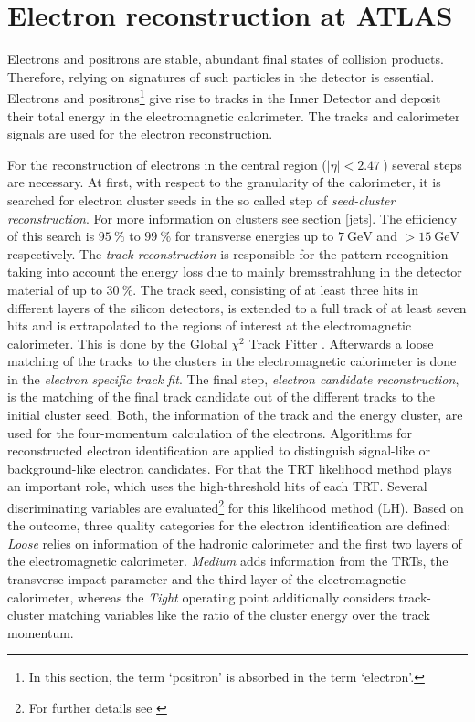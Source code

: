 \section{Electron reconstruction at ATLAS}\label{eReconstruction}
Electrons and positrons are stable, abundant final states of collision products. Therefore, relying on signatures of such particles in the detector is essential. Electrons and positrons\footnote{In this section, the term `positron' is absorbed in the term `electron'.} give rise to tracks in the Inner Detector and deposit their total energy in the electromagnetic calorimeter. The tracks and calorimeter signals are used for the electron reconstruction. \cite{ePerformance}\par
For the reconstruction of electrons in the central region ($|\eta|<\SI{2.47}{}$) several steps are necessary. At first, with respect to the granularity of the calorimeter, it is searched for electron cluster seeds in the so called step of \textit{seed-cluster reconstruction}. For more information on clusters see section \ref{jets}. The efficiency of this search is $\SI{95}{\percent}$ to $\SI{99}{\percent}$ for transverse energies up to $\SI{7}{\giga\electronvolt}$ and $>\SI{15}{\giga\electronvolt}$ respectively. The \textit{track reconstruction} is responsible for the pattern recognition taking into account the energy loss due to mainly bremsstrahlung in the detector material of up to $\SI{30}{\percent}$. The track seed, consisting of at least three hits in different layers of the silicon detectors, is extended to a full track of at least seven hits and is extrapolated to the regions of interest at the electromagnetic calorimeter. This is done by the {\ATLAS} Global $\chi^2$ Track Fitter \cite{trackfitter}. Afterwards a loose matching of the tracks to the clusters in the electromagnetic calorimeter is done in the \textit{electron specific track fit}. The final step, \textit{electron candidate reconstruction}, is the matching of the final track candidate out of the different tracks to the initial cluster seed. \cite{ePerformance}\newline
Both, the information of the track and the energy cluster, are used for the four-momentum calculation of the electrons. Algorithms for reconstructed electron identification are applied to distinguish signal-like or background-like electron candidates. For that the TRT likelihood method plays an important role, which uses the high-threshold hits of each TRT. Several discriminating variables are evaluated\footnote{For further details see \cite{ePerformance}} for this likelihood method (LH). Based on the outcome, three quality categories for the electron identification are defined: \textit{Loose} relies on information of the hadronic calorimeter and the first two layers of the electromagnetic calorimeter. \textit{Medium} adds information from the TRTs, the transverse impact parameter and the third layer of the electromagnetic calorimeter, whereas the \textit{Tight} operating point additionally considers track-cluster matching variables like the ratio of the cluster energy over the track momentum. \cite{ePerformance}\newline
